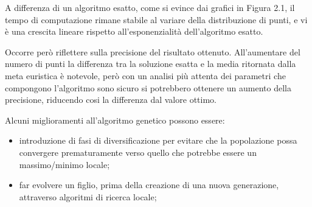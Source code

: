 A differenza di un algoritmo esatto, come si evince dai grafici in Figura 2.1, il tempo di computazione rimane stabile al variare della distribuzione di punti, e vi è una crescita lineare rispetto all'esponenzialità dell'algoritmo esatto.

Occorre però riflettere sulla precisione del risultato ottenuto. All'aumentare del numero di punti la differenza tra la soluzione esatta e la media ritornata dalla meta euristica è notevole, però con un analisi più attenta dei parametri che compongono l'algoritmo sono sicuro si potrebbero ottenere un aumento della precisione, riducendo cosi la differenza dal valore ottimo.

Alcuni miglioramenti all'algoritmo genetico possono essere:

\begin{itemize}
\item introduzione di fasi di diversificazione per evitare che la popolazione possa convergere prematuramente verso quello che potrebbe essere un massimo/minimo locale;
\item far evolvere un figlio, prima della creazione di una nuova generazione, attraverso algoritmi di ricerca locale;
\end{itemize}